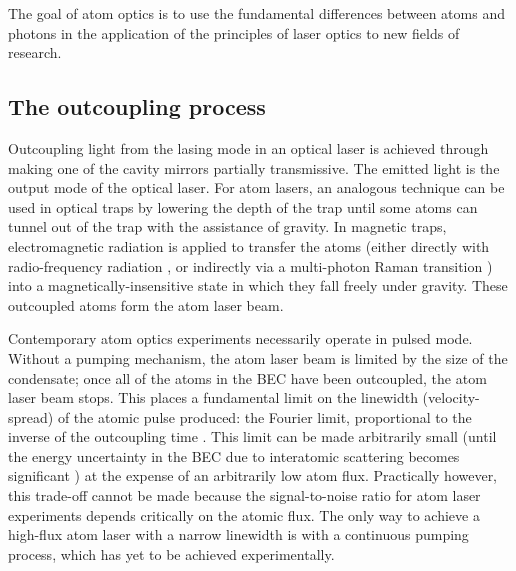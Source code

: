 The goal of atom optics is to use the fundamental differences between atoms and photons in the application of the principles of laser optics to new fields of research.

\subsection{The outcoupling process}

Outcoupling light from the lasing mode in an optical laser is achieved through making one of the cavity mirrors partially transmissive.  The emitted light is the output mode of the optical laser.  For atom lasers, an analogous technique can be used in optical traps by lowering the depth of the trap until some atoms can tunnel out of the trap with the assistance of gravity.  In magnetic traps, electromagnetic radiation is applied to transfer the atoms (either directly with radio-frequency radiation \citep{Mewes:1997,Bloch:1999mi}, or indirectly via a multi-photon Raman transition \citep{Moy:1997,Hagley:1999dz,Robins:2006fk}) into a magnetically-insensitive state in which they fall freely under gravity.  These outcoupled atoms form the atom laser beam.

Contemporary atom optics experiments necessarily operate in pulsed mode.  Without a pumping mechanism, the atom laser beam is limited by the size of the condensate; once all of the atoms in the BEC have been outcoupled, the atom laser beam stops.  This places a fundamental limit on the linewidth (velocity-spread) of the atomic pulse produced: the Fourier limit, proportional to the inverse of the outcoupling time \citep{Johnsson:2007}.  This limit can be made arbitrarily small (until the energy uncertainty in the BEC due to interatomic scattering becomes significant \cite{Johnsson:2007a}) at the expense of an arbitrarily low atom flux.  Practically however, this trade-off cannot be made because the signal-to-noise ratio for atom laser experiments depends critically on the atomic flux.  The only way to achieve a high-flux atom laser with a narrow linewidth is with a continuous pumping process, which has yet to be achieved experimentally. 

